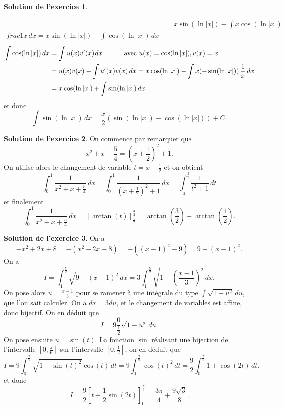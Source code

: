 \documentclass[a4paper, 11pt,openany]{article}%
\theoremstyle{plain}
\theoremstyle{definition}
\newtheorem{exo}{Exercice}
\newtheorem{sol}{Solution de l'exercice}
\theoremstyle{remark}
\begin{document}
\begin{sol}
\begin{enumerate}
\begin{align*}
  &= x \sin(\ln|x|) - \int x \cos(\ln|x|) \, \\frac{1}{x}\, dx = x
  \sin(\ln|x|) -\int \cos(\ln|x|)\, dx
\end{align*}
\begin{align*}
  \int \cos(\ln|x|)\, dx &= \int u(x) v'(x)\, dx 
\mbox{\hspace{1cm} avec } u(x)=\cos(\ln|x|),v(x)=x\\
&= u(x) v(x) 
- \int u'(x) v(x)\, dx= 
x \cos(\ln|x|) - \int x (-\sin(\ln|x|)) \, \frac{1}{x}\, dx\\
&= x \cos(\ln|x|) +\int \sin(\ln|x|)\, dx
\end{align*}
et donc
\[
\int \sin(\ln|x|)\, dx = \frac{x}{2}(\sin(\ln|x|)-\cos(\ln|x|))+C.
\]
\end{enumerate}
\end{sol}
   
%

\begin{sol}
On commence par remarquer que
\[ x^2 + x + \frac{5}{4} = \left( x + \frac{1}{2} \right)^2 +1.\]
On utilise alors le changement de variable $t = x+\frac{1}{2}$ et on obtient
\[ \int_0^1 \frac{1}{x^2 + x + \frac{5}{4}} \, dx= \int_0^1 \frac{1}{\left( x +\frac{1}{2} \right)^2 +1} \, dx = \int_{\frac{1}{2}}^{\frac{3}{2}} \frac{1}{t^2 +1} \, dt\]
et finalement
\[ \int_0^1 \frac{1}{x^2 + x + \frac{5}{4}} \, dx = \left[ \arctan(t) \right]_{\frac{1}{2}}^{\frac{3}{2}} = \arctan \left( \frac{3}{2} \right) - \arctan \left( \frac{1}{2} \right). \]
\end{sol}



\begin{sol}
On a
\[ - x^2 + 2x + 8 = -(x^2 - 2x - 8) = -((x-1)^2 - 9) = 9 - (x-1)^2.\]
 On a 
 \[ I= \int_1^{\frac{5}{2}} \sqrt{9- (x-1)^2} \, dx = 3 \int_{1}^{\frac{5}{2}} \sqrt{1 - \left( \frac{x-1}{3} \right)^2} \, dx.\]
 On pose alors $u=\frac{x-1}{3}$ pour se ramener à une intégrale du type $\int \sqrt{1 - u^2}\, du$, que l'on sait calculer. On a $dx=3du$, et le changement de variables est affine, donc bijectif. On en déduit que 
 \[ I=9 \frac{0}{\frac{1}{2}} \sqrt{1-u^2} \, du.\]
 On pose ensuite $u=\sin(t)$. La fonction $\sin$ réalisant une bijection de l'intervalle $\left[0,\frac{\pi}{6} \right]$ sur l'intervalle $\left[0, \frac{1}{2} \right]$, on en déduit que 
 \[ I=9 \int_0^{\frac{\pi}{6}} \sqrt{1-\sin(t)^2} \cos(t) \, dt = 9\int_0^{\frac{\pi}{6}} \cos(t)^2 \, dt = \frac{9}{2} \int_0^{\frac{\pi}{6}} 1+\cos(2t) \, dt.\]
 et donc
 \[ I = \frac{9}{2} \left[ t + \frac{1}{2} \sin(2t) \right]_0^{\frac{\pi}{6}} = \frac{3 \pi}{4} + \frac{9 \sqrt{3}}{8}.\]
\end{sol}
\end{document}
